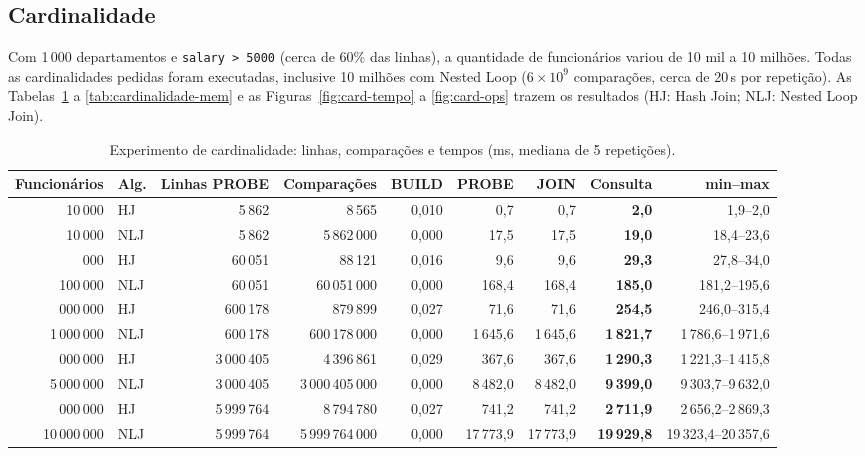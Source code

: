 \documentclass[11pt,a4paper]{article}
\begin{document}
\subsection{Cardinalidade}
Com 1\,000 departamentos e \texttt{salary > 5000} (cerca de 60\% das linhas), a quantidade de funcionários variou de 10 mil a 10 milhões. Todas as cardinalidades pedidas foram executadas, inclusive 10 milhões com Nested Loop ($6 \times 10^9$ comparações, cerca de 20\,s por repetição). As Tabelas~\ref{tab:cardinalidade-tempo} a \ref{tab:cardinalidade-mem} e as Figuras~\ref{fig:card-tempo} a \ref{fig:card-ops} trazem os resultados (HJ: Hash Join; NLJ: Nested Loop Join).

\begin{table}[H]
\centering
\footnotesize
\setlength{\tabcolsep}{3.5pt}
\begin{tabular}{@{}rlrrrrrrr@{}}
\toprule
Funcionários & Alg. & Linhas PROBE & Comparações & BUILD & PROBE & JOIN & Consulta & min--max \\
\midrule
10\,000 & HJ & 5\,862 & 8\,565 & 0,010 & 0,7 & 0,7 & \textbf{2,0} & 1,9--2,0 \\
10\,000 & NLJ & 5\,862 & 5\,862\,000 & 0,000 & 17,5 & 17,5 & \textbf{19,0} & 18,4--23,6 \\
\addlinespace[2pt]
100\,000 & HJ & 60\,051 & 88\,121 & 0,016 & 9,6 & 9,6 & \textbf{29,3} & 27,8--34,0 \\
100\,000 & NLJ & 60\,051 & 60\,051\,000 & 0,000 & 168,4 & 168,4 & \textbf{185,0} & 181,2--195,6 \\
\addlinespace[2pt]
1\,000\,000 & HJ & 600\,178 & 879\,899 & 0,027 & 71,6 & 71,6 & \textbf{254,5} & 246,0--315,4 \\
1\,000\,000 & NLJ & 600\,178 & 600\,178\,000 & 0,000 & 1\,645,6 & 1\,645,6 & \textbf{1\,821,7} & 1\,786,6--1\,971,6 \\
\addlinespace[2pt]
5\,000\,000 & HJ & 3\,000\,405 & 4\,396\,861 & 0,029 & 367,6 & 367,6 & \textbf{1\,290,3} & 1\,221,3--1\,415,8 \\
5\,000\,000 & NLJ & 3\,000\,405 & 3\,000\,405\,000 & 0,000 & 8\,482,0 & 8\,482,0 & \textbf{9\,399,0} & 9\,303,7--9\,632,0 \\
\addlinespace[2pt]
10\,000\,000 & HJ & 5\,999\,764 & 8\,794\,780 & 0,027 & 741,2 & 741,2 & \textbf{2\,711,9} & 2\,656,2--2\,869,3 \\
10\,000\,000 & NLJ & 5\,999\,764 & 5\,999\,764\,000 & 0,000 & 17\,773,9 & 17\,773,9 & \textbf{19\,929,8} & 19\,323,4--20\,357,6 \\
\bottomrule
\end{tabular}
\caption{Experimento de cardinalidade: linhas, comparações e tempos (ms, mediana de 5 repetições).}
\label{tab:cardinalidade-tempo}
\end{table}
\end{document}
